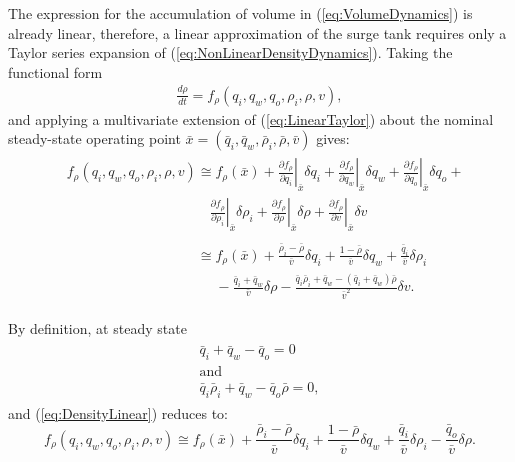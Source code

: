 \documentclass[preprint,authoryear,12pt]{elsarticle}
\begin{document}
The expression for the accumulation of volume in (\ref{eq:VolumeDynamics}) is already linear, therefore, a linear approximation of the surge tank requires only a Taylor series expansion of (\ref{eq:NonLinearDensityDynamics}). Taking the functional form
\begin{gather}
	\frac{d\rho}{dt} = f_{\rho}(q_i, q_w, q_o, \rho_i, \rho, v),
\end{gather}
and applying a multivariate extension of (\ref{eq:LinearTaylor}) about the nominal steady-state operating point $\bar{x} = (\bar{q}_i, \bar{q}_w, \bar{\rho}_i, \bar{\rho}, \bar{v})$ gives:
\begin{align}
	\begin{split}
	&f_{\rho}(q_i, q_w, q_o, \rho_i, \rho, v) \cong \left. f_{\rho}(\bar{x}) + \frac{\partial f_{\rho}}{\partial q_i}\right\rvert_{\bar{x}}\delta q_i + \left.\frac{\partial f_{\rho}}{\partial q_w}\right\rvert_{\bar{x}}\delta q_w + \left.\frac{\partial f_{\rho}}{\partial q_o}\right\rvert_{\bar{x}}\delta q_o + \\
	&\phantom{f(q_i, q_w, q_o, \rho_i, \rho, v) \cong}\left.\frac{\partial f_{\rho}}{\partial \rho_i}\right\rvert_{\bar{x}}\delta \rho_i + \left.\frac{\partial f_{\rho}}{\partial \rho}\right\rvert_{\bar{x}}\delta \rho + \left.\frac{\partial f_{\rho}}{\partial v}\right\rvert_{\bar{x}}\delta v\\ 
	\\
	&\phantom{f_{\rho}(q_i, q_w, q_o, \rho_i, \rho, v)} \cong f_{\rho}(\bar{x}) + \frac{\bar{\rho}_i - \bar{\rho}}{\bar{v}}\delta q_i + \frac{1 - \bar{\rho}}{\bar{v}}\delta q_w + \frac{\bar{q}_i}{\bar{v}}\delta \rho_i \\
	&\phantom{f_{\rho}(q_i, q_w, q_o, \rho_i, \rho, v) \cong } - \frac{\bar{q}_i + \bar{q}_w}{\bar{v}}\delta \rho -  \frac{\bar{q}_i\bar{\rho}_i + \bar{q}_w - (\bar{q}_i + \bar{q}_w)\bar{\rho}}{\bar{v}^2} \delta v .
	\end{split}
	\label{eq:DensityLinear}
\end{align}

By definition, at steady state
\begin{align}
\begin{split}
	\bar{q}_i + \bar{q}_w - \bar{q}_o = 0 \\
	\text{and} \\
	\bar{q}_i\bar{\rho}_i + \bar{q}_w - \bar{q}_o\bar{\rho} = 0,
\end{split}
\end{align}
and (\ref{eq:DensityLinear}) reduces to: 
\begin{equation}
	f_{\rho}(q_i, q_w, q_o, \rho_i, \rho, v) \cong f_{\rho}(\bar{x}) +\frac{\bar{\rho}_i - \bar{\rho}}{\bar{v}}\delta q_i + \frac{1 - \bar{\rho}}{\bar{v}}\delta q_w + \frac{\bar{q}_i}{\bar{v}}\delta \rho_i - \frac{\bar{q}_o }{\bar{v}}\delta \rho .
	\label{eq:DensityLinearSimple}	
\end{equation}
\end{document}
